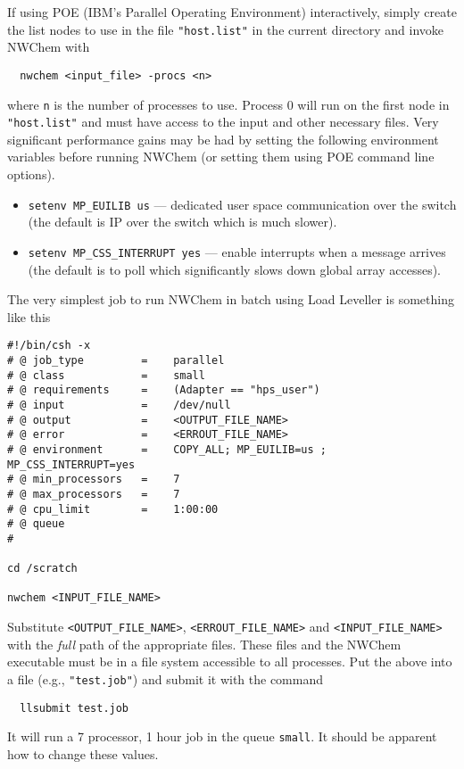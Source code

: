 If using POE (IBM's Parallel Operating Environment) interactively,
simply create the list nodes to use in the file \verb+"host.list"+ in
the current directory and invoke NWChem with
\begin{verbatim}
  nwchem <input_file> -procs <n>
\end{verbatim}
where \verb+n+ is the number of processes to use.  Process 0 will run
on the first node in \verb+"host.list"+ and must have access to the
input and other necessary files.  Very significant performance gains
may be had by setting the following environment variables before
running NWChem (or setting them using POE command line options).
\begin{itemize}
\item \verb+setenv MP_EUILIB us+ --- dedicated user space
  communication over the switch (the default is IP over the switch
  which is much slower).
\item \verb+setenv MP_CSS_INTERRUPT yes+ --- enable interrupts when a 
  message arrives (the default is to poll which significantly slows
  down global array accesses).
\end{itemize}

The very simplest job to run NWChem in batch using Load Leveller is
something like this
\begin{verbatim}
#!/bin/csh -x
# @ job_type         =    parallel
# @ class            =    small
# @ requirements     =    (Adapter == "hps_user")
# @ input            =    /dev/null
# @ output           =    <OUTPUT_FILE_NAME>
# @ error            =    <ERROUT_FILE_NAME>
# @ environment      =    COPY_ALL; MP_EUILIB=us ; MP_CSS_INTERRUPT=yes
# @ min_processors   =    7
# @ max_processors   =    7
# @ cpu_limit        =    1:00:00
# @ queue
#

cd /scratch

nwchem <INPUT_FILE_NAME>
\end{verbatim}

Substitute \verb+<OUTPUT_FILE_NAME>+, \verb+<ERROUT_FILE_NAME>+ and
\verb+<INPUT_FILE_NAME>+ with the {\em full} path of the appropriate
files.  These files and the NWChem executable must be in a file system
accessible to all processes.  Put the above into a file (e.g.,
\verb+"test.job"+) and submit it with the command
\begin{verbatim}
  llsubmit test.job
\end{verbatim}
It will run a 7 processor, 1 hour job in the queue \verb+small+.  It
should be apparent how to change these values.

